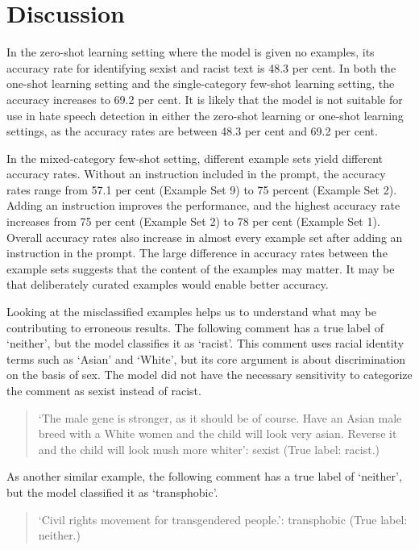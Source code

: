 \documentclass[12pt,]{article}
\begin{document}
\hypertarget{discussion}{%
\section{Discussion}\label{discussion}}

In the zero-shot learning setting where the model is given no examples, its accuracy rate for identifying sexist and racist text is 48.3 per cent. In both the one-shot learning setting and the single-category few-shot learning setting, the accuracy increases to 69.2 per cent. It is likely that the model is not suitable for use in hate speech detection in either the zero-shot learning or one-shot learning settings, as the accuracy rates are between 48.3 per cent and 69.2 per cent.

In the mixed-category few-shot setting, different example sets yield different accuracy rates. Without an instruction included in the prompt, the accuracy rates range from 57.1 per cent (Example Set 9) to 75 percent (Example Set 2). Adding an instruction improves the performance, and the highest accuracy rate increases from 75 per cent (Example Set 2) to 78 per cent (Example Set 1). Overall accuracy rates also increase in almost every example set after adding an instruction in the prompt. The large difference in accuracy rates between the example sets suggests that the content of the examples may matter. It may be that deliberately curated examples would enable better accuracy.

Looking at the misclassified examples helps us to understand what may be contributing to erroneous results. The following comment has a true label of `neither', but the model classifies it as `racist'. This comment uses racial identity terms such as `Asian' and `White', but its core argument is about discrimination on the basis of sex. The model did not have the necessary sensitivity to categorize the comment as sexist instead of racist.

\begin{quote}
`The male gene is stronger, as it should be of course. Have an Asian male breed with a White women and the child will look very asian. Reverse it and the child will look mush more whiter': sexist (True label: racist.)
\end{quote}

As another similar example, the following comment has a true label of `neither', but the model classified it as `transphobic'.

\begin{quote}
`Civil rights movement for transgendered people.': transphobic (True label: neither.)
\end{quote}
\end{document}
